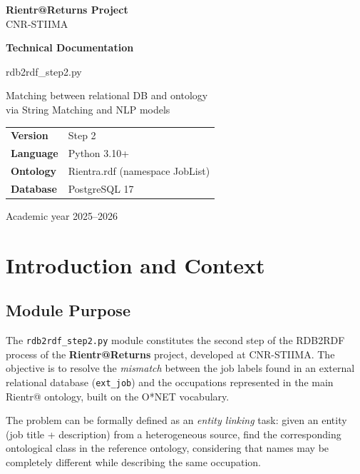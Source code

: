 \documentclass[12pt, a4paper]{report}
\begin{document}
% 

\begin{titlepage}
  \centering
  \vspace*{2cm}
  {\Large\textbf{Rientr@Returns Project}\\[0.4em]
   \large CNR-STIIMA}\par
  \vspace{2.5cm}
  {\Huge\bfseries\color{headcolor} Technical Documentation\par}
  \vspace{0.8cm}
  {\LARGE\ttfamily rdb2rdf\_step2.py\par}
  \vspace{0.5cm}
  {\large Matching between relational DB and ontology\\
   via String Matching and NLP models\par}
  \vspace{3cm}
  \begin{tabular}{ll}
    \textbf{Version}   & Step 2 \\[0.3em]
    \textbf{Language} & Python 3.10+ \\[0.3em]
    \textbf{Ontology}  & Rientra.rdf (namespace JobList) \\[0.3em]
    \textbf{Database}   & PostgreSQL 17 \\[0.3em]
  \end{tabular}
  \vfill
  {\small\textcolor{codegray}{Academic year 2025--2026}}
\end{titlepage}

\tableofcontents
\clearpage

% 
\chapter{Introduction and Context}
% 

\section{Module Purpose}

The \texttt{rdb2rdf\_step2.py} module constitutes the second step of
the RDB2RDF process of the \textbf{Rientr@Returns} project, developed
at CNR-STIIMA. The objective is to resolve the \emph{mismatch} between
the job labels found in an external relational database
(\texttt{ext\_job}) and the occupations represented in the main
Rientr@ ontology, built on the O*NET vocabulary.

The problem can be formally defined as an \emph{entity
linking} task: given an entity (job title + description) from a
heterogeneous source, find the corresponding ontological class
in the reference ontology, considering that names may be
completely different while describing the same occupation.
\end{document}
